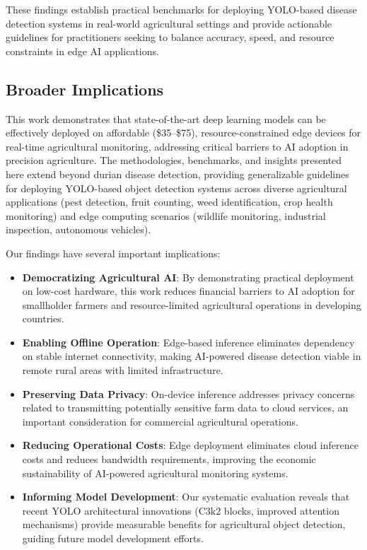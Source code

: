 These findings establish practical benchmarks for deploying YOLO-based disease detection systems in real-world agricultural settings and provide actionable guidelines for practitioners seeking to balance accuracy, speed, and resource constraints in edge AI applications.

\subsection{Broader Implications}

This work demonstrates that state-of-the-art deep learning models can be effectively deployed on affordable (\$35--\$75), resource-constrained edge devices for real-time agricultural monitoring, addressing critical barriers to AI adoption in precision agriculture. The methodologies, benchmarks, and insights presented here extend beyond durian disease detection, providing generalizable guidelines for deploying YOLO-based object detection systems across diverse agricultural applications (pest detection, fruit counting, weed identification, crop health monitoring) and edge computing scenarios (wildlife monitoring, industrial inspection, autonomous vehicles).

Our findings have several important implications:

\begin{itemize}
\item \textbf{Democratizing Agricultural AI}: By demonstrating practical deployment on low-cost hardware, this work reduces financial barriers to AI adoption for smallholder farmers and resource-limited agricultural operations in developing countries.

\item \textbf{Enabling Offline Operation}: Edge-based inference eliminates dependency on stable internet connectivity, making AI-powered disease detection viable in remote rural areas with limited infrastructure.

\item \textbf{Preserving Data Privacy}: On-device inference addresses privacy concerns related to transmitting potentially sensitive farm data to cloud services, an important consideration for commercial agricultural operations.

\item \textbf{Reducing Operational Costs}: Edge deployment eliminates cloud inference costs and reduces bandwidth requirements, improving the economic sustainability of AI-powered agricultural monitoring systems.

\item \textbf{Informing Model Development}: Our systematic evaluation reveals that recent YOLO architectural innovations (C3k2 blocks, improved attention mechanisms) provide measurable benefits for agricultural object detection, guiding future model development efforts.
\end{itemize}

